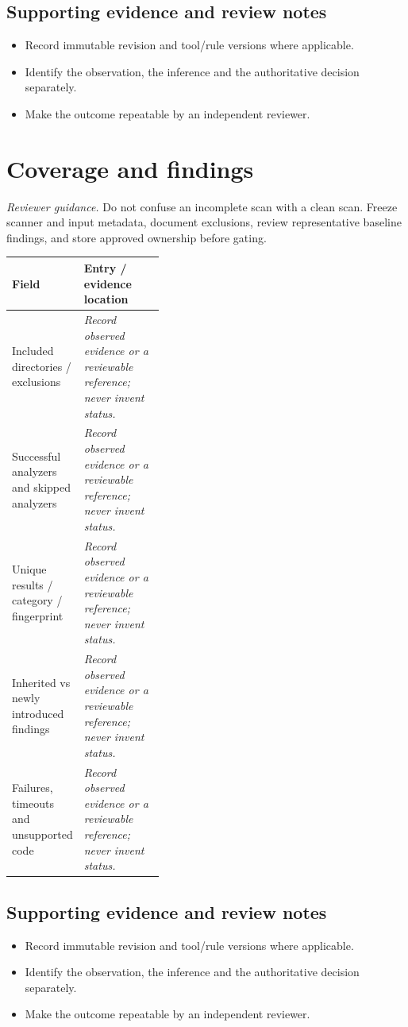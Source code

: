 \documentclass[10pt,letterpaper]{article}
\begin{document}
\subsection{Supporting evidence and review notes}
\begin{itemize}
\item Record immutable revision and tool/rule versions where applicable.
\item Identify the observation, the inference and the authoritative decision separately.
\item Make the outcome repeatable by an independent reviewer.
\end{itemize}
\clearpage
\section{Coverage and findings}
\textit{Reviewer guidance.} Do not confuse an incomplete scan with a clean scan. Freeze scanner and input metadata, document exclusions, review representative baseline findings, and store approved ownership before gating.
\begin{tabularx}{\linewidth}{@{}p{0.38\linewidth}Y@{}}
\toprule Field & Entry / evidence location\\\midrule
Included directories / exclusions & \textit{Record observed evidence or a reviewable reference; never invent status.}\\[1.0em]
\midrule
Successful analyzers and skipped analyzers & \textit{Record observed evidence or a reviewable reference; never invent status.}\\[1.0em]
\midrule
Unique results / category / fingerprint & \textit{Record observed evidence or a reviewable reference; never invent status.}\\[1.0em]
\midrule
Inherited vs newly introduced findings & \textit{Record observed evidence or a reviewable reference; never invent status.}\\[1.0em]
\midrule
Failures, timeouts and unsupported code & \textit{Record observed evidence or a reviewable reference; never invent status.}\\[1.0em]
\midrule
\end{tabularx}
\subsection{Supporting evidence and review notes}
\begin{itemize}
\item Record immutable revision and tool/rule versions where applicable.
\item Identify the observation, the inference and the authoritative decision separately.
\item Make the outcome repeatable by an independent reviewer.
\end{itemize}
\clearpage
\end{document}
